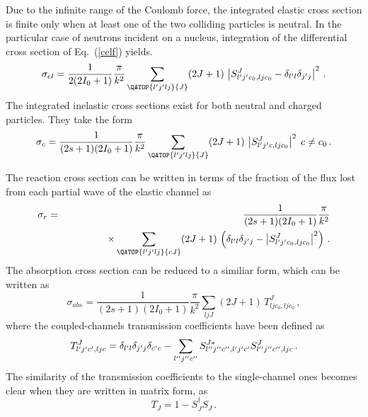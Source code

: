 Due to the infinite range of the Coulomb force, the integrated elastic cross
section is finite only when at least one of the two colliding particles is
neutral. In the particular case of neutrons incident on a nucleus,
integration of the differential cross section of Eq.~(\ref{celf}) yields.
\begin{equation}
\sigma_{el}=\frac{1}{2(2I_{0}+1)}\frac{\pi}{k^{2}}\sum_{{{\QATOP{%
l^{\prime}j^{\prime}lj}{J}}}}(2J+1)\,\left|S_{l^{\prime}j^{%
\prime}c_{0},ljc_{0}}^{J}-\delta_{l^{\prime}l}\delta_{j^{\prime}j}%
\right|^{2}\,.
\end{equation}
The integrated inelastic cross sections exist for both neutral and
charged particles. They take the form
\begin{equation}
\sigma_{c}=\frac{1}{(2s+1)(2I_{0}+1)}\frac{\pi}{k^{2}}\sum_{{{\QATOP{%
l^{\prime}j^{\prime}lj}{J}}}}(2J+1)\,\left|S_{l^{\prime}j^{%
\prime}c,ljc_{0}}^{J}\right|^{2}\; c\neq c_{0}\,.
\end{equation}

The reaction cross section can be written in terms of the fraction of the
flux lost from each partial wave of the elastic channel as
\begin{eqnarray}
\sigma_{r} & = & \frac{1}{(2s+1)(2I_{0}+1)}\frac{\pi}{k^{2}} \\
& & \qquad\qquad\times\sum_{{{\QATOP{l^{\prime}j^{\prime}lj}{cJ}}}%
}(2J+1)\,\left(\delta_{l^{\prime}l}\delta_{j^{\prime}j}-\left|S_{l^{%
\prime}j^{\prime}c_{0},ljc_{0}}^{J}\right|^{2}\right)\,.  \nonumber
\end{eqnarray}
The absorption cross section can be reduced to a similiar form, which can be
written as
\begin{equation}
\sigma_{abs}=\frac{1}{(2s+1)(2I_{0}+1)}\frac{\pi}{k^{2}}\sum_{ljJ}(2J+1)\,
T_{ljc_{0},ljc_{0}}^{J}\,,
\end{equation}
where the coupled-channels transmission coefficients have been defined as
\begin{equation}
T_{l^{\prime}j^{\prime}c^{\prime},ljc}^{J}=\delta_{l^{\prime}l}\delta_{j^{%
\prime}j}\delta_{c^{\prime}c}-\sum_{l^{\prime\prime}j^{\prime\prime}c^{%
\prime\prime}}S_{l^{\prime\prime}j^{\prime\prime}c^{\prime\prime},l^{%
\prime}j^{\prime}c^{\prime}}^{J*}S_{l^{\prime\prime}j^{\prime\prime}c^{%
\prime\prime},ljc}^{J}\,.
\end{equation}
The similarity of the transmission coefficients to the single-channel ones
becomes clear when they are written in matrix form, as
\begin{equation}
T_{J}=1-S_{J}^{\dagger}S_{J}\,.
\end{equation}

